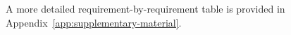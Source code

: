 A more detailed requirement-by-requirement table is provided in Appendix~\ref{app:supplementary-material}.















